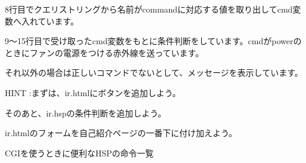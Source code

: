 \bigskip

8行目でクエリストリングから名前がcommandに対応する値を取り出してcmd変数へ入れています。

9〜15行目で受け取ったcmd変数をもとに条件判断をしています。cmdがpowerのときにファンの電源をつける赤外線を送っています。

それ以外の場合は正しいコマンドでないとして、メッセージを表示しています。


\begin{tcolorbox}[title=\useOmetoi,breakable]\label{Q:IR}
  \begin{enumerate}
  \end{enumerate}
    HINT :まずは、ir.htmlにボタンを追加しよう。

    そのあと、ir.hspの条件判断を追加しよう。

    ir.htmlのフォームを自己紹介ページの一番下に付け加えよう。
\end{tcolorbox}





\clearpage

\label{P:gpio}
CGIを使うときに便利なHSPの命令一覧

